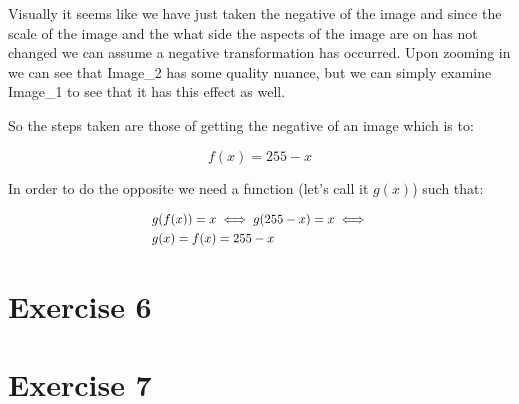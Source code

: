 \documentclass[12pt, a4paper]{article}
\begin{document}
\begin{multicols}{2}
    Visually it seems like we have just taken the negative of the image and since the scale of the image and the what side the aspects of the image are on has not changed we can assume a negative transformation has occurred. Upon zooming in we can see that Image\_2 has some quality nuance, but we can simply examine Image\_1 to see that it has this effect as well.
    \newline

    So the steps taken are those of getting the negative of an image which is to: 
    \newline

    \[f(x) = 255 - x\]
    \newline

    In order to do the opposite we need a function (let's call it $g(x)$) such that:
    \newline

    \[
        \resizebox{0.45\textwidth}{!}{$
        \begin{aligned}
            & g(f(x)) = x \iff g(255 - x) = x \iff \\
            & g(x) = f(x) = 255 - x
        \end{aligned}
        $}
    \]
    \newline

    \section{Exercise 6} \label{sec:ex6}

    \newline

    \section{Exercise 7} \label{sec:ex7}

    \printbibliography

\end{multicols}
\end{document}
